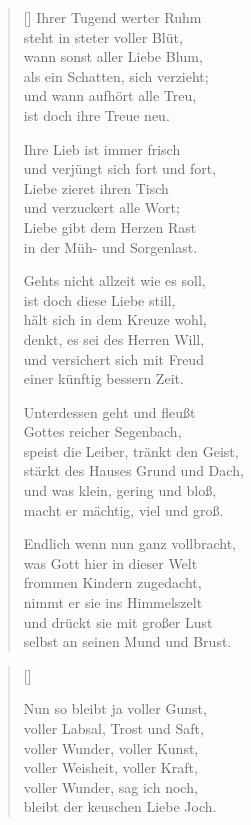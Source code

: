 \begin{multicols}{2}
\begin{verse}[\versewidth]
 Ihrer Tugend werter Ruhm\\
steht in steter voller Blüt,\\
wann sonst aller Liebe Blum,\\
als ein Schatten, sich verzieht;\\
und wann aufhört alle Treu,\\
ist doch ihre Treue neu.

 Ihre Lieb ist immer frisch\\
und verjüngt sich fort und fort,\\
Liebe zieret ihren Tisch\\
und verzuckert alle Wort;\\
Liebe gibt dem Herzen Rast\\
in der Müh- und Sorgenlast.

 Gehts nicht allzeit wie es soll,\\
ist doch diese Liebe still,\\
hält sich in dem Kreuze wohl,\\
denkt, es sei des Herren Will,\\
und versichert sich mit Freud\\
einer künftig bessern Zeit.

 Unterdessen geht und fleußt\\
Gottes reicher Segenbach,\\
speist die Leiber, tränkt den Geist,\\
stärkt des Hauses Grund und Dach,\\
und was klein, gering und bloß,\\
macht er mächtig, viel und groß.

 Endlich wenn nun ganz vollbracht,\\
was Gott hier in dieser Welt\\
frommen Kindern zugedacht,\\
nimmt er sie ins Himmelszelt\\
und drückt sie mit großer Lust\\
selbst an seinen Mund und Brust.



\end{verse}
\end{multicols}


\begin{center}
\settowidth{\versewidth}{Der, vor dem die Welt erschrickt,}
\begin{verse}[\versewidth]

 Nun so bleibt ja voller Gunst,\\
voller Labsal, Trost und Saft,\\
voller Wunder, voller Kunst,\\
voller Weisheit, voller Kraft,\\
voller Wunder, sag ich noch,\\
bleibt der keuschen Liebe Joch.
  
\end{verse}
\end{center}



